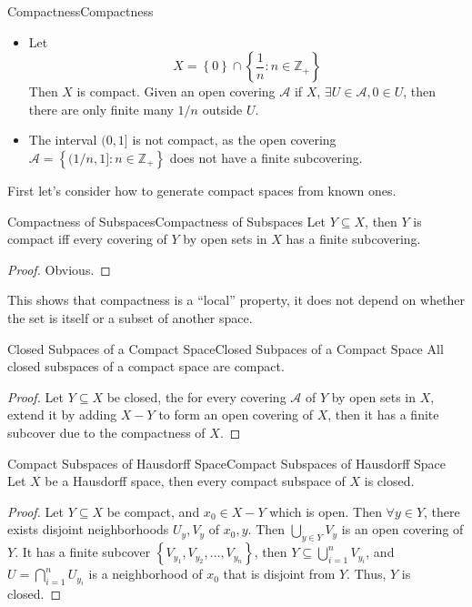 \documentclass[../main.tex]{subfiles}
\begin{document}
\begin{example}{Compactness}{Compactness}
\begin{itemize}
\item Let
	\begin{equation*}
	X = \left\{ 0 \right\}\cap \left\{ \frac{1}{n}: n\in \mathbb{Z}_+ \right\}
	\end{equation*}
	Then $X$ is compact. Given an open covering $\mathcal{A}$ if $X$, $\exists U \in \mathcal{A}, 0\in U$, then there are only finite many $1 / n$ outside $U$.
\item The interval $(0,1]$ is not compact, as the open covering $\mathcal{A} = \left\{ (1 / n,1]: n\in \mathbb{Z}_+ \right\}$ does not have a finite subcovering.
\end{itemize}
\end{example}

First let's consider how to generate compact spaces from known ones.

\begin{lemma}{Compactness of Subspaces}{Compactness of Subspaces}
Let $Y \subseteq X$, then $Y$ is compact iff every covering of $Y$ by open sets in $X$ has a finite subcovering.
\end{lemma}
\begin{proof}
Obvious.
\end{proof}
\begin{remark}
This shows that compactness is a ``local'' property, it does not depend on whether the set is itself or a subset of another space.
\end{remark}

\begin{theorem}{Closed Subpaces of a Compact Space}{Closed Subpaces of a Compact Space}
All closed subspaces of a compact space are compact.
\end{theorem}
\begin{proof}
Let $Y \subseteq X$ be closed, the for every covering $\mathcal{A}$ of $Y$ by open sets in $X$, extend it by adding $X-Y$ to form an open covering of $X$, then it has a finite subcover due to the compactness of $X$.
\end{proof}

\begin{theorem}{Compact Subspaces of Hausdorff Space}{Compact Subspaces of Hausdorff Space}
Let $X$ be a Hausdorff space, then every compact subspace of $X$ is closed.
\end{theorem}
\begin{proof}
	Let $Y \subseteq X$ be compact, and $x_0\in X-Y$ which is open. Then $\forall y\in Y$, there exists disjoint neighborhoods $U_y,V_y$ of $x_0,y$.  Then $\bigcup_{y\in Y} V_y$ is an open covering of $Y$. It has a finite subcover $\left\{ V_{y_1},V_{y_2},\ldots,V_{y_n} \right\}$, then $Y \subseteq \bigcup_{i=1}^{n} V_{y_i}$, and $U = \bigcap_{i=1}^{n} U_{y_i}$ is a neighborhood of $x_0$ that is disjoint from $Y$. Thus, $Y$ is closed.
\end{proof}
\end{document}
